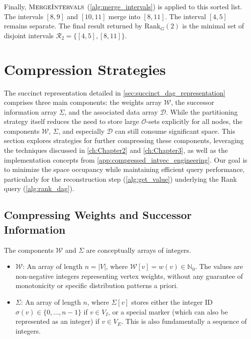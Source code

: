 Finally, $\textsc{MergeIntervals}$ (\ref{alg:merge_intervals}) is applied to this sorted list. The intervals $[8, 9]$ and $[10, 11]$ merge into $[8, 11]$. The interval $[4, 5]$ remains separate. The final result returned by $\mathrm{Rank}_G(2)$ is the minimal set of disjoint intervals $\mathcal{R}_2 = \{ [4, 5], [8, 11] \}$.

\section{Compression Strategies}
\label{sec:compression_strategies}

The succinct representation detailed in \autoref{sec:succinct_dag_representation} comprises three main components: the weights array $\mathcal{W}$, the successor information array $\Sigma$, and the associated data array $\mathcal{D}$. While the partitioning strategy itself reduces the need to store large $\mathcal{O}$-sets explicitly for all nodes, the components $\mathcal{W}$, $\Sigma$, and especially $\mathcal{D}$ can still consume significant space. This section explores strategies for further compressing these components, leveraging the techniques discussed in \autoref{ch:Chapter2} and \autoref{ch:Chapter3}, as well as the implementation concepts from \autoref{app:compressed_intvec_engineering}. Our goal is to minimize the space occupancy while maintaining efficient query performance, particularly for the reconstruction step (\autoref{alg:get_value}) underlying the Rank query (\autoref{alg:rank_dag}).

\subsection{Compressing Weights and Successor Information}
\label{subsec:compressing_W_Sigma}

The components $\mathcal{W}$ and $\Sigma$ are conceptually arrays of integers.
\begin{itemize}
    \item $\mathcal{W}$: An array of length $n = |V|$, where $\mathcal{W}[v] = w(v) \in \mathbb{N}_0$. The values are non-negative integers representing vertex weights, without any guarantee of monotonicity or specific distribution patterns a priori.
    \item $\Sigma$: An array of length $n$, where $\Sigma[v]$ stores either the integer ID $\sigma(v) \in \{0, \dots, n-1\}$ if $v \in V_I$, or a special marker (which can also be represented as an integer) if $v \in V_E$. This is also fundamentally a sequence of integers.
\end{itemize}

